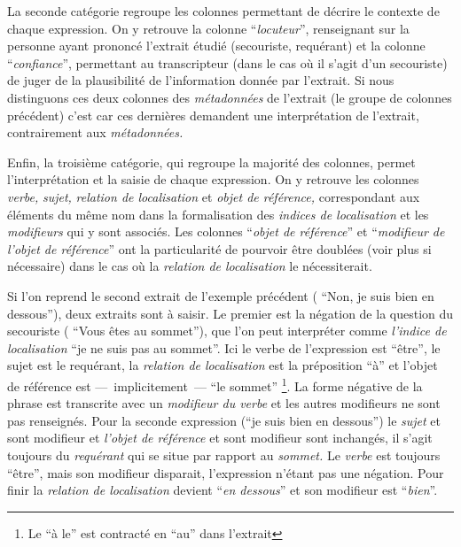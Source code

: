 La seconde catégorie regroupe les colonnes permettant de décrire le
contexte de chaque expression. On y retrouve la colonne
\enquote{\emph{locuteur}}, renseignant sur la personne ayant prononcé
l'extrait étudié (\eg secouriste, requérant) et la colonne
\enquote{\emph{confiance}}, permettant au transcripteur (dans le cas
où il s'agit d'un secouriste) de juger de la plausibilité de
l'information donnée par l'extrait. Si nous distinguons ces deux
colonnes des \emph{métadonnées} de l'extrait (\ie le groupe de
colonnes précédent) c'est car ces dernières demandent une
interprétation de l'extrait, contrairement aux \emph{métadonnées.}

Enfin, la troisième catégorie, qui regroupe la majorité des colonnes,
permet l'interprétation et la saisie de chaque expression. On y
retrouve les colonnes \emph{verbe,} \emph{sujet,} \emph{relation de
  localisation} et \emph{objet de référence,} correspondant aux
éléments du même nom dans la formalisation des \emph{indices de
  localisation} et les \emph{modifieurs} qui y sont associés.
%
Les colonnes \enquote{\emph{objet de référence}} et
\enquote{\emph{modifieur de l'objet de référence}} ont la
particularité de pourvoir être doublées (voir plus si nécessaire) dans
le cas où la \emph{relation de localisation} le nécessiterait.

Si l'on reprend le second extrait de l'exemple précédent (\ie
\enquote{Non, je suis bien en dessous}), deux extraits sont à
saisir. Le premier est la négation de la question du secouriste (\ie
\enquote{Vous êtes au sommet}), que l'on peut interpréter comme
\emph{l'indice de localisation} \enquote{je ne suis pas au
  sommet}. Ici le verbe de l'expression est \enquote{être}, le sujet
est le requérant, la \emph{relation de localisation} est la
préposition \enquote{à} et l'objet de référence est
---~implicitement~--- \enquote{le sommet} \footnote{Le \enquote{à le}
  est contracté en \enquote{au} dans l'extrait}. La forme négative de
la phrase est transcrite avec un \emph{modifieur du verbe} et les
autres modifieurs ne sont pas renseignés. Pour la seconde expression
(\ie \enquote{je suis bien en dessous}) le \emph{sujet} et sont
modifieur et \emph{l'objet de référence} et sont modifieur sont
inchangés, il s'agit toujours du \emph{requérant} qui se situe par
rapport au \emph{sommet.} Le \emph{verbe} est toujours \enquote{être},
mais son modifieur disparait, l'expression n'étant pas une
négation. Pour finir la \emph{relation de localisation} devient
\enquote{\emph{en dessous}} et son modifieur est
\enquote{\emph{bien}}.

